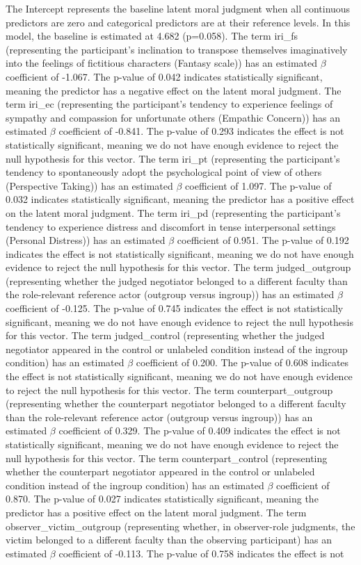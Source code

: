 \documentclass[11pt]{article}
\begin{document}
The Intercept represents the baseline latent moral judgment when all continuous predictors are zero and categorical predictors are at their reference levels. In this model, the baseline is estimated at 4.682 (p=0.058). The term iri\_fs (representing the participant's inclination to transpose themselves imaginatively into the feelings of fictitious characters (Fantasy scale)) has an estimated $\beta$ coefficient of -1.067. The p-value of 0.042 indicates statistically significant, meaning the predictor has a negative effect on the latent moral judgment. The term iri\_ec (representing the participant's tendency to experience feelings of sympathy and compassion for unfortunate others (Empathic Concern)) has an estimated $\beta$ coefficient of -0.841. The p-value of 0.293 indicates the effect is not statistically significant, meaning we do not have enough evidence to reject the null hypothesis for this vector. The term iri\_pt (representing the participant's tendency to spontaneously adopt the psychological point of view of others (Perspective Taking)) has an estimated $\beta$ coefficient of 1.097. The p-value of 0.032 indicates statistically significant, meaning the predictor has a positive effect on the latent moral judgment. The term iri\_pd (representing the participant's tendency to experience distress and discomfort in tense interpersonal settings (Personal Distress)) has an estimated $\beta$ coefficient of 0.951. The p-value of 0.192 indicates the effect is not statistically significant, meaning we do not have enough evidence to reject the null hypothesis for this vector. The term judged\_outgroup (representing whether the judged negotiator belonged to a different faculty than the role-relevant reference actor (outgroup versus ingroup)) has an estimated $\beta$ coefficient of -0.125. The p-value of 0.745 indicates the effect is not statistically significant, meaning we do not have enough evidence to reject the null hypothesis for this vector. The term judged\_control (representing whether the judged negotiator appeared in the control or unlabeled condition instead of the ingroup condition) has an estimated $\beta$ coefficient of 0.200. The p-value of 0.608 indicates the effect is not statistically significant, meaning we do not have enough evidence to reject the null hypothesis for this vector. The term counterpart\_outgroup (representing whether the counterpart negotiator belonged to a different faculty than the role-relevant reference actor (outgroup versus ingroup)) has an estimated $\beta$ coefficient of 0.329. The p-value of 0.409 indicates the effect is not statistically significant, meaning we do not have enough evidence to reject the null hypothesis for this vector. The term counterpart\_control (representing whether the counterpart negotiator appeared in the control or unlabeled condition instead of the ingroup condition) has an estimated $\beta$ coefficient of 0.870. The p-value of 0.027 indicates statistically significant, meaning the predictor has a positive effect on the latent moral judgment. The term observer\_victim\_outgroup (representing whether, in observer-role judgments, the victim belonged to a different faculty than the observing participant) has an estimated $\beta$ coefficient of -0.113. The p-value of 0.758 indicates the effect is not 
\end{document}
